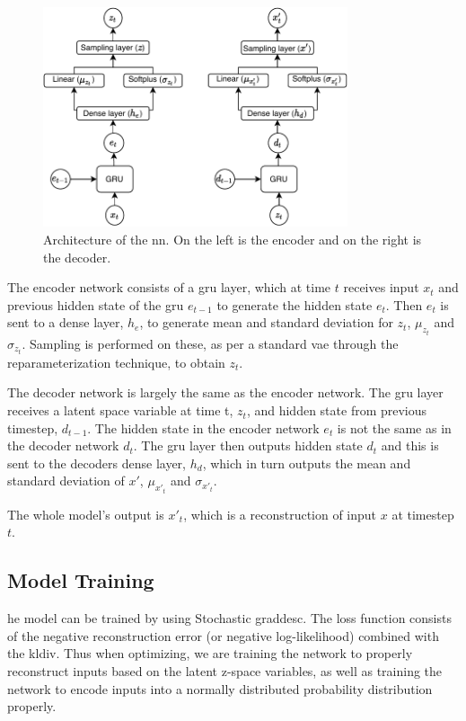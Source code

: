 \begin{figure}[htbp]
    \centering
    \includegraphics[width=0.8\textwidth]{Pictures/Sprint_3/NetworkArchitecture.pdf}
    \caption{Architecture of the \gls{nn}. On the left is the encoder and on the right is the decoder.}
    \label{fig:nn_arch}
\end{figure}

The encoder network consists of a \gls{gru} layer, which at time $t$ receives input $x_t$ and previous hidden state of the \gls{gru} $e_{t-1}$ to generate the hidden state $e_t$. Then $e_t$ is sent to a dense layer, $h_e$, to generate mean and standard deviation for $z_t$, $\mu_{z_t}$ and $\sigma_{z_t}$. Sampling is performed on these, as per a standard \gls{vae} through the reparameterization technique, to obtain $z_t$.

The decoder network is largely the same as the encoder network. The \gls{gru} layer receives a latent space variable at time t, $z_t$, and hidden state from previous timestep, $d_{t-1}$. The hidden state in the encoder network $e_t$ is not the same as in the decoder network $d_t$. The \gls{gru} layer then outputs hidden state $d_t$ and this is sent to the decoders dense layer, $h_d$, which in turn outputs the mean and standard deviation of $x'$, $\mu_{x'_t}$ and $\sigma_{x'_t}$.

The whole model's output is $x'_t$, which is a reconstruction of input $x$ at timestep $t$.

\subsection{Model Training}
he model can be trained by using Stochastic \gls{graddesc}.
The loss function consists of the negative reconstruction error (or negative log-likelihood) combined with the \gls{kldiv}. Thus when optimizing, we are training the network to properly reconstruct inputs based on the latent z-space variables, as well as training the network to encode inputs into a normally distributed probability distribution properly.

